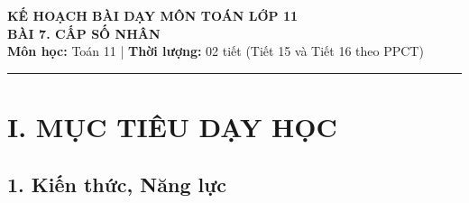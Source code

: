\documentclass[12pt, a4paper]{article}
\begin{document}
\begin{center}
    {\Large \textbf{KẾ HOẠCH BÀI DẠY MÔN TOÁN LỚP 11}}\\[0.4em]
    {\LARGE \textbf{BÀI 7. CẤP SỐ NHÂN}}\\[0.5em]
    \textbf{Môn học:} Toán 11 | \textbf{Thời lượng:} 02 tiết (Tiết 15 và Tiết 16 theo PPCT)
\end{center}


\vspace{0.5em}
\hrule
\vspace{1em}


\section*{I. MỤC TIÊU DẠY HỌC}


\subsection*{1. Kiến thức, Năng lực}
\end{document}
